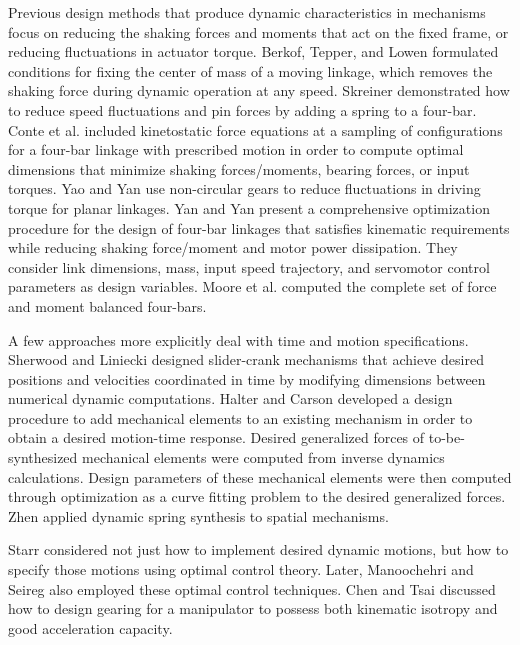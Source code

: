 \documentclass[journal]{IEEEtran}
\begin{document}
Previous design methods that produce dynamic characteristics in mechanisms focus on reducing the shaking forces and moments that act on the fixed frame, or reducing fluctuations in actuator torque.
Berkof, Tepper, and Lowen \cite{berkofNewMethodCompletely1969,tepperGeneralTheoremsConcerning1972,lowenBalancingLinkagesUpdate1983} formulated conditions for fixing the center of mass of a moving linkage, which removes the shaking force during dynamic operation at any speed.
Skreiner \cite{skreinerDynamicAnalysisUsed1970} demonstrated how to reduce speed fluctuations and pin forces by adding a spring to a four-bar.
Conte et al. \cite{conteOptimumMechanismDesign1975} included kinetostatic force equations at a sampling of configurations for a four-bar linkage with prescribed motion in order to compute optimal dimensions that minimize shaking forces/moments, bearing forces, or input torques.
Yao and Yan \cite{yaoNewMethodTorque2003} use non-circular gears to reduce fluctuations in driving torque for planar linkages.
Yan and Yan \cite{yanIntegratedControlMechanism2009} present a comprehensive optimization procedure for the design of four-bar linkages that satisfies kinematic requirements while reducing shaking force/moment and motor power dissipation.  They consider link dimensions, mass, input speed trajectory, and servomotor control parameters as design variables.
Moore et al. \cite{mooreDeterminationCompleteSet2009} computed the complete set of force and moment balanced four-bars.


A few approaches more explicitly deal with time and motion specifications.  
Sherwood \cite{sherwoodDynamicSynthesisMechanism1968} and Liniecki \cite{linieckiSynthesisSlidercrankMechanism1970} designed slider-crank mechanisms that achieve desired positions and velocities coordinated in time by modifying dimensions between numerical dynamic computations.
Halter and Carson \cite{halterMechanismForceSystemSynthesis1975} developed a design procedure to add mechanical elements to an existing mechanism in order to obtain a desired motion-time response.  Desired generalized forces of to-be-synthesized mechanical elements were computed from inverse dynamics calculations.  Design parameters of these mechanical elements were then computed through optimization as a curve fitting problem to the desired generalized forces.  Zhen \cite{zhenAnalyticalSynthesisSpring1988} applied dynamic spring synthesis to spatial mechanisms.


Starr \cite{starrDynamicSynthesisConstraint1973} considered not just how to implement desired dynamic motions, but how to specify those motions using optimal control theory.  
Later, Manoochehri and Seireg \cite{manoochehriComputerBasedMethodologyForm1990} also employed these optimal control techniques.  Chen and Tsai \cite{chenKinematicDynamicSynthesis1993} discussed how to design gearing for a manipulator to possess both kinematic isotropy and good acceleration capacity.
\end{document}

